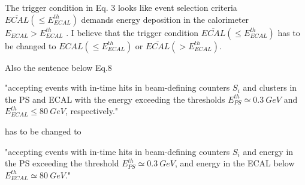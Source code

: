 \documentclass[11pt]{article}
\begin{document}
The trigger condition in Eq. 3 looks like event selection criteria ${\overline{ECAL}(\leq E^{th}_{ECAL})} $  demands energy deposition in the calorimeter $E_{ECAL}>E^{th}_{ECAL}$ . I believe that the trigger condition ${\overline{ECAL}(\leq E^{th}_{ECAL})} $ has to be changed to 
${{ECAL}(\leq E^{th}_{ECAL})} $ or ${\overline{ECAL}(> E^{th}_{ECAL})} $.

Also the sentence below Eq.8 

"accepting events with in-time hits in beam-defining counters
$S_i$ and clusters in the PS and ECAL with the
energy exceeding the thresholds $E^{th}_{PS}\simeq 0.3~GeV$ and
$E^{th}_{ECAL}\leq 80~GeV$, respectively."

has to be changed to 

"accepting events with in-time hits in beam-defining counters
$S_i$ and energy in the PS 
 exceeding the threshold $E^{th}_{PS}\simeq 0.3~GeV$, and energy in the ECAL below 
$E^{th}_{ECAL}\simeq 80~GeV$."
\end{document}
